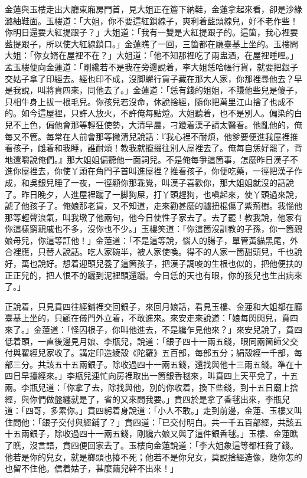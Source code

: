 金蓮與玉樓走出大廳東廂房門首，見大姐正在簷下納鞋，金蓮拿起來看，卻是沙綠潞紬鞋面。玉樓道：「大姐，你不要這紅鎖線子，爽利着藍頭線兒，好不老作些！你明日還要大紅提跟子？」大姐道：「我有一雙是大紅提跟子的。這箇，我心裡要藍提跟子，所以使大紅線鎖口。」金蓮瞧了一回，三箇都在廳臺基上坐的。玉樓問大姐：「你女婿在屋裡不在？」大姐道：「他不知那裡吃了兩盅酒，在屋裡睡哩。」孟玉樓便向金蓮道：「剛纔若不是我在旁邊說着，李大姐恁哈帳行貨，就要把銀子交姑子拿了印經去。經也印不成，沒脚蠏行貨子藏在那大人家，你那裡尋他去？早是我說，叫將賁四來，同他去了。」金蓮道：「恁有錢的姐姐，不賺他些兒是傻子，只相牛身上拔一根毛兒。你孩兒若沒命，休說捨經，隨你把萬里江山捨了也成不的。如今這屋裡，只許人放火，不許俺每點燈。大姐聽着，也不是別人。偏染的白兒不上色，偏他會那等輕狂使勢，大清早晨，刁蹬着漢子請太醫看。他亂他的，俺每又不管。每常在人前會那等撇清兒說話：『我心裡不耐煩，他爹要便進我屋裡推看孩子，雌着和我睡，誰耐煩！教我就攛掇往別人屋裡去了。俺每自恁好罷了，{}{}背地還嚼說俺們。』那大姐姐偏聽他一面詞兒。不是俺每爭這箇事，怎麼昨日漢子不進你屋裡去，你使丫頭在角門子首叫進屋裡？推看孩子，你便吃藥，一徑把漢子作成，和吳銀兒睡了一夜，{}一徑顯你那乖覺，叫漢子喜歡你，那大姐姐就沒的話說了。昨日晚夕，人進屋裡躧了一脚狗屎，打丫頭趕狗，也嗔起來，使丫頭過來說，諕了他孩子了。俺娘那老貨，又不知道，走來勸甚麼的驢扭棍傷了紫荊樹。我惱他那等輕聲浪氣，叫我墩了他兩句，他今日使性子家去了。去了罷！教我說，他家有你這樣窮親戚也不多，沒你也不少。」玉樓笑道：「你這箇沒訓教的子孫，你一箇親娘母兒，你這等訌他！」金蓮道：「不是這等說，惱人的腸子，單管黃貓黑尾，外合裡應，只替人說話。吃人家碗半，被人家使喚。得不的人家一箇甜頭兒，千也說好，萬也說好。想着迎頭兒養了這箇孩子，把漢子調唆的生根也似的，把他便扶的正正兒的，把人恨不的躧到泥裡頭還躧。今日恁的天也有眼，你的孩兒也生出病來了。」

正說着，只見賁四往經鋪裡交回銀子，來回月娘話，看見玉樓、金蓮和大姐都在廳臺基上坐的，只顧在儀門外立着，不敢進來。來安走來說道：「娘每閃閃兒，賁四來了。」金蓮道：「怪囚根子，你叫他進去，不是纔乍見他來？」來安兒說了，賁四低着頭，一直後邊見月娘、李瓶兒，說道：「銀子四十一兩五錢，眼同兩箇師父交付與翟經兒家收了。講定印造綾殼《陀羅》五百部，每部五分；絹殼經一千部，每部三分。共該五十五兩銀子。除收過四十一兩五錢，還找與他十三兩五錢。準在十四日早擡經來。」李瓶兒連忙向房裡取出一箇銀香毬來，叫賁四上天平兌了，十五兩。李瓶兒道：「你拿了去，除找與他，別的你收着，換下些錢，到十五日廟上捨經，與你們做盤纏就是了，省的又來問我要。」賁四於是拿了香毬出來，李瓶兒道：「四哥，多累你。」賁四躬着身說道：「小人不敢。」走到前邊，金蓮、玉樓又叫住問他：「銀子交付與經鋪了？」賁四道：「已交付明白。共一千五百部經，共該五十五兩銀子，除收過四十一兩五錢，剛纔六娘又與了這件銀香毬。」玉樓、金蓮瞧了瞧，沒言語，賁四便回家去了。玉樓向金蓮說道：「李大姐象這等都枉費了錢。他若是你的兒女，就是榔頭也摏不死；他若不是你兒女，莫說捨經造像，隨你怎的也留不住他。信着姑子，甚麼繭兒幹不出來！」

